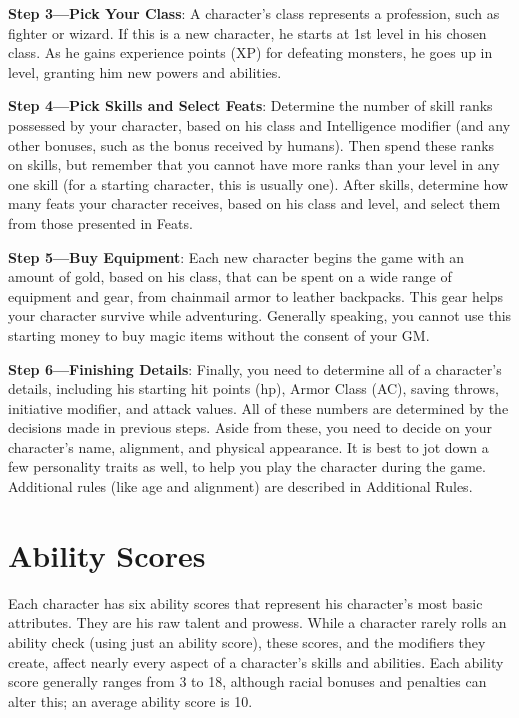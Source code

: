 \textbf{Step 3---Pick Your Class}: A character's class represents a profession, such as fighter or wizard. If this is a new character, he starts at 1st level in his chosen class. As he gains experience points (XP) for defeating monsters, he goes up in level, granting him new powers and abilities.
				
\textbf{Step 4---Pick Skills and Select Feats}: Determine the number of skill ranks possessed by your character, based on his class and Intelligence modifier (and any other bonuses, such as the bonus received by humans). Then spend these ranks on skills, but remember that you cannot have more ranks than your level in any one skill (for a starting character, this is usually one). After skills, determine how many feats your character receives, based on his class and level, and select them from those presented in Feats.
				
\textbf{Step 5---Buy Equipment}: Each new character begins the game with an amount of gold, based on his class, that can be spent on a wide range of equipment and gear, from chainmail armor to leather backpacks. This gear helps your character survive while adventuring. Generally speaking, you cannot use this starting money to buy magic items without the consent of your GM.
				
\textbf{Step 6---Finishing Details}: Finally, you need to determine all of a character's details, including his starting hit points (hp), Armor Class (AC), saving throws, initiative modifier, and attack values. All of these numbers are determined by the decisions made in previous steps. Aside from these, you need to decide on your character's name, alignment, and physical appearance. It is best to jot down a few personality traits as well, to help you play the character during the game. Additional rules (like age and alignment) are described in Additional Rules.
				
\section{Ability Scores}

				
Each character has six ability scores that represent his character's most basic attributes. They are his raw talent and prowess. While a character rarely rolls an ability check (using just an ability score), these scores, and the modifiers they create, affect nearly every aspect of a character's skills and abilities. Each ability score generally ranges from 3 to 18, although racial bonuses and penalties can alter this; an average ability score is 10.
				
